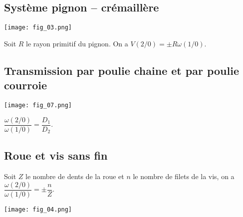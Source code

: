 \subsection{Système pignon -- crémaillère}

\begin{marginfigure}
\texttt{[image: fig\_03.png]}
\end{marginfigure}

\begin{resultat}
Soit $R$ le rayon primitif du pignon. On a $V(2/0) = \pm R \omega(1/0)$.
\end{resultat}

\subsection{Transmission par poulie chaine et par poulie courroie}
\begin{table*}[!h]
\begin{minipage}[c]{.6\linewidth}
\begin{center}
\texttt{[image: fig\_07.png]}
\end{center}
\end{minipage}\hfill
\begin{minipage}[c]{.4\linewidth}
\begin{resultat}

$\dfrac{\omega(2/0)}{\omega(1/0)} = \dfrac{D_1}{D_2}$.
\end{resultat}
\end{minipage}
\end{table*}

\subsection{Roue et vis sans fin}
\begin{table*}[!h]
\begin{minipage}[c]{.4\linewidth}
\begin{resultat}
Soit $Z$ le nombre de dents de la roue et $n$ le nombre de filets de la vis, on a 
$\dfrac{\omega(2/0)}{\omega(1/0)} = \pm \dfrac{n}{Z}$.
\end{resultat}
\end{minipage}\hfill
\begin{minipage}[c]{.6\linewidth}
\begin{center}
\texttt{[image: fig\_04.png]}
\end{center}
\end{minipage}
\end{table*}


